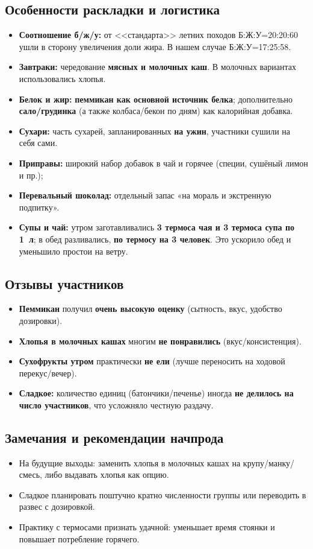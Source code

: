 	\subsection{Особенности раскладки и логистика}
	\begin{itemize}
		\item \textbf{Соотношение б/ж/у:} от <<стандарта>> летних походов Б:Ж:У=20:20:60 ушли в сторону увеличения доли жира. В нашем случае Б:Ж:У=17:25:58.
		\item \textbf{Завтраки:} чередование \textbf{мясных и молочных каш}. В молочных вариантах использовались хлопья.
		\item \textbf{Белок и жир:} \textbf{пеммикан как основной источник белка}; дополнительно \textbf{сало/грудинка}
		(а также колбаса/бекон по дням) как калорийная добавка.
		\item \textbf{Сухари:} часть сухарей, запланированных \textbf{на ужин}, участники сушили на себя сами.
		\item \textbf{Приправы:} широкий набор добавок в чай и горячее (специи, сушёный лимон и пр.);
		\item \textbf{Перевальный шоколад:} отдельный запас «на мораль и экстренную подпитку».
		\item \textbf{Супы и чай:} утром заготавливались \textbf{3 термоса чая и 3 термоса супа по 1~л};
		в обед разливались, \textbf{по термосу на 3 человек}. Это ускорило обед и уменьшило простои на ветру.
	\end{itemize}
	
	\subsection{Отзывы участников}
	\begin{itemize}
		\item \textbf{Пеммикан} получил \textbf{очень высокую оценку} (сытность, вкус, удобство дозировки).
		\item \textbf{Хлопья в молочных кашах} многим \textbf{не понравились} (вкус/консистенция).
		\item \textbf{Сухофрукты утром} практически \textbf{не ели} (лучше переносить на ходовой перекус/вечер).
		\item \textbf{Сладкое:} количество единиц (батончики/печенье) иногда \textbf{не делилось на число участников},
		что усложняло честную раздачу.
	\end{itemize}
	
	\subsection{Замечания и рекомендации начпрода}
	\begin{itemize}
		\item На будущие выходы: заменить хлопья в молочных кашах на крупу/манку/смесь, либо выдавать хлопья как опцию.
		\item Сладкое планировать поштучно кратно численности группы или переводить в развес с дозировкой.
		\item Практику с термосами признать удачной: уменьшает время стоянки и повышает потребление горячего.
	\end{itemize}
	

\clearpage
